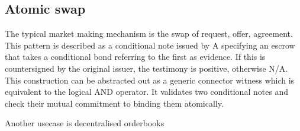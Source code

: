 \subsection{Atomic swap}

The typical market making mechanism is the swap of request, offer, agreement. This pattern is described as a conditional note issued by A specifying an escrow that takes a conditional bond referring to the first as evidence. 
If this is countersigned by the original issuer, the testimony is positive, otherwise N/A.
This construction can be abstracted out as a generic connector witness which is equivalent to the logical AND operator. It validates two conditional notes and check their mutual commitment to binding them atomically. 

Another usecase is decentralised orderbooks